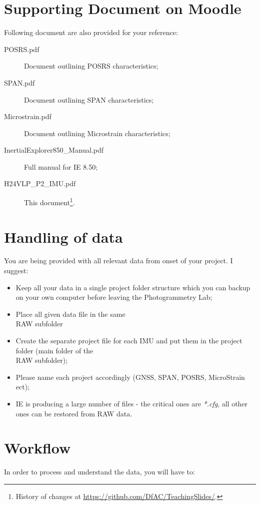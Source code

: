 \documentclass[11pt,fleqn]{book} %
\newcommand{\thisDocRef}{\footnote{History of changes at \url{https://github.com/DfAC/TeachingSlides/}.}}
\begin{document}
\section{Supporting Document on Moodle}

Following document are also provided for your reference:

	\begin{description}
	\item [{POSRS.pdf}] Document outlining POSRS characteristics;
	\item [{SPAN.pdf}] Document outlining SPAN characteristics;
	\item [{Microstrain.pdf}] Document outlining Microstrain characteristics;
	\item [{InertialExplorer850\_Manual.pdf}] Full manual for IE 8.50;
	\item [{H24VLP\_P2\_IMU.pdf}] This document\thisDocRef.
	\end{description}

\section{Handling of data}

You are being provided with all relevant data from onset of your project. I suggest:

\begin{itemize}
	\item Keep all your data in a single project folder structure which you can backup on your own computer before leaving the Photogrammetry Lab;
	\item Place all given data file in the same  \\RAW subfolder
	\item Create the separate project file for each IMU and put them in the project folder (main folder of the \\RAW subfolder);
	\item Please name each project accordingly (GNSS, SPAN, POSRS, MicroStrain ect); 
	\item IE is producing a large number of files - the critical ones are \textit{*.cfg}, all other ones can be restored from RAW data.
\end{itemize}


\section{Workflow}

In order to process and understand the data, you will have to:
\end{document}
